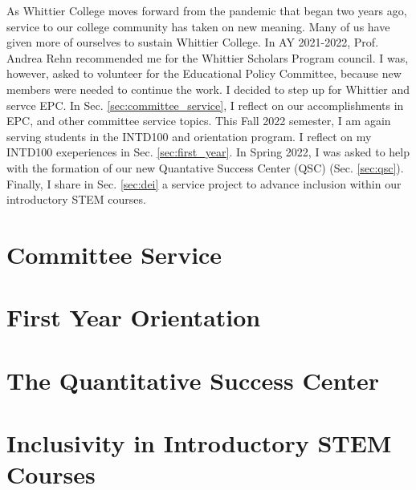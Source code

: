 \documentclass[../../main.tex]{subfiles}
\begin{document}
\label{sec:service}

As Whittier College moves forward from the pandemic that began two years ago, service to our college community has taken on new meaning.  Many of us have given more of ourselves to sustain Whittier College.  In AY 2021-2022, Prof. Andrea Rehn recommended me for the Whittier Scholars Program council.  I was, however, asked to volunteer for the Educational Policy Committee, because new members were needed to continue the work.  I decided to step up for Whittier and servce EPC.  In Sec. \ref{sec:committee_service}, I reflect on our accomplishments in EPC, and other committee service topics.  This Fall 2022 semester, I am again serving students in the INTD100 and orientation program.  I reflect on my INTD100 exeperiences in Sec. \ref{sec:first_year}.  In Spring 2022, I was asked to help with the formation of our new Quantative Success Center (QSC) (Sec. \ref{sec:qsc}).  Finally, I share in Sec. \ref{sec:dei} a service project to advance inclusion within our introductory STEM courses.

\section{Committee Service}

\begin{flushleft}

\end{flushleft}

\section{First Year Orientation}

\begin{flushleft}

\end{flushleft}

\section{The Quantitative Success Center}

\begin{flushleft}

\end{flushleft}

\section{Inclusivity in Introductory STEM Courses}

\begin{flushleft}

\end{flushleft}
\end{document}
